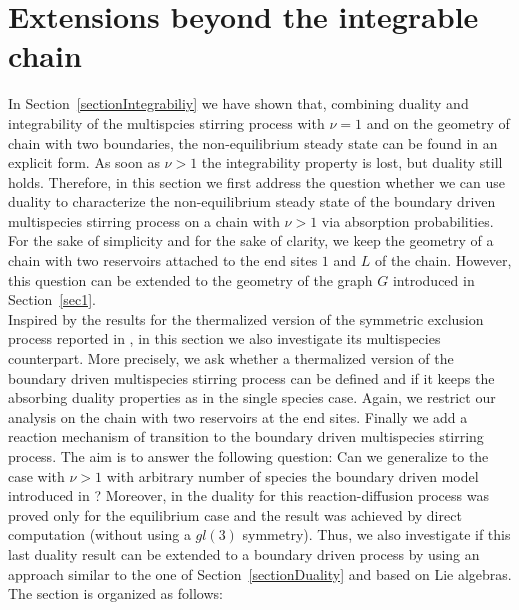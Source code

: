 \documentclass[10pt]{article}
\numberwithin{equation}{section}
\numberwithin{equation}{subsection}
\begin{document}
\section{Extensions beyond the integrable chain}
\label{sec5}
In Section~\ref{sectionIntegrabiliy} we have shown that, combining duality and integrability of the multispcies stirring process with $\nu=1$ and on the geometry of chain with two boundaries, the non-equilibrium steady state can be found in an explicit form. As soon as $\nu>1$ the integrability property is lost, but duality still holds. Therefore, in this section we first address the  question whether we can use duality to characterize the non-equilibrium steady state of the boundary driven multispecies stirring process on a chain with $\nu>1$ via absorption probabilities. For the sake of simplicity and  for the sake of clarity, we keep the geometry of a chain with two reservoirs attached to the end sites $1$ and $L$ of the chain. However, this question can be extended to the geometry of the graph $G$ introduced in Section~\ref{sec1}.  \\
Inspired by the results for the thermalized version of the symmetric exclusion process reported in \cite{carinci2013duality}, in this section we also investigate its multispecies counterpart. More precisely, we ask whether a thermalized version of the boundary driven multispecies stirring process can be defined and if it keeps the absorbing duality properties as in the single species case. Again, we restrict our analysis on the chain with two reservoirs at the end sites. Finally we add a reaction mechanism of transition to the boundary driven multispecies stirring process. The aim is to answer the following question: Can we generalize to the case with $\nu>1$ with arbitrary number of species the boundary driven model introduced in \cite{casini2022uphill}? Moreover, in \cite{casini2022uphill} the duality for this reaction-diffusion process was proved only for the equilibrium case and the result was achieved by direct computation (without using a $gl(3)$ symmetry). Thus, we also investigate if this last duality result can be extended to a boundary driven process by using an approach similar to the one of Section~\ref{sectionDuality} and based on Lie algebras. The section is organized as follows: 
\end{document}
